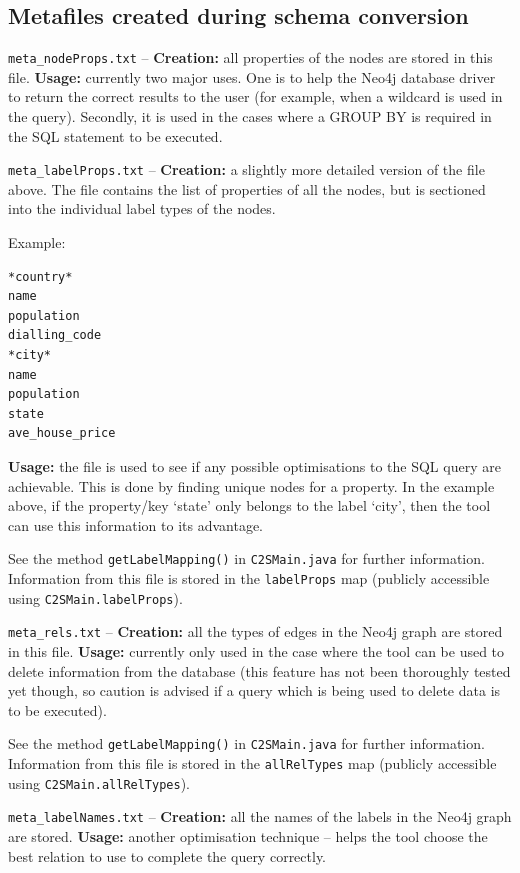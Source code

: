 \documentclass[letterpaper]{ltxdoc}
\begin{document}
\subsection{Metafiles created during schema conversion}
\label{ssec:meta}
\texttt{meta\_nodeProps.txt} -- \textbf{Creation:} all properties of the nodes are stored in this file. \textbf{Usage:} currently two major uses. One is to help the Neo4j database driver to return the correct results to the user (for example, when a wildcard is used in the query). Secondly, it is used in the cases where a GROUP BY is required in the SQL statement to be executed.

\bigskip

\texttt{meta\_labelProps.txt} -- \textbf{Creation:} a slightly more detailed version of the file above. The file contains the list of properties of all the nodes, but is sectioned into the individual label types of the nodes.

Example:
\begin{verbatim}
*country*
name
population
dialling_code
*city*
name
population
state
ave_house_price
\end{verbatim}

\textbf{Usage:} the file is used to see if any possible optimisations to the SQL query are achievable. This is done by finding unique nodes for a property. In the example above, if the property/key `state' only belongs to the label `city', then the tool can use this information to its advantage.

See the method \texttt{getLabelMapping()} in \texttt{C2SMain.java} for further information. Information from this file is stored in the \texttt{labelProps} map (publicly accessible using \texttt{C2SMain.labelProps}).

\bigskip

\texttt{meta\_rels.txt} -- \textbf{Creation:} all the types of edges in the Neo4j graph are stored in this file.
\textbf{Usage:} currently only used in the case where the tool can be used to delete information from the database (this feature has not been thoroughly tested yet though, so caution is advised if a query which is being used to delete data is to be executed).

See the method \texttt{getLabelMapping()} in \texttt{C2SMain.java} for further information. Information from this file is stored in the \texttt{allRelTypes} map (publicly accessible using \texttt{C2SMain.allRelTypes}).

\bigskip

\texttt{meta\_labelNames.txt} -- \textbf{Creation:} all the names of the labels in the Neo4j graph are stored.
\textbf{Usage:} another optimisation technique -- helps the tool choose the best relation to use to complete the query correctly.
\end{document}
